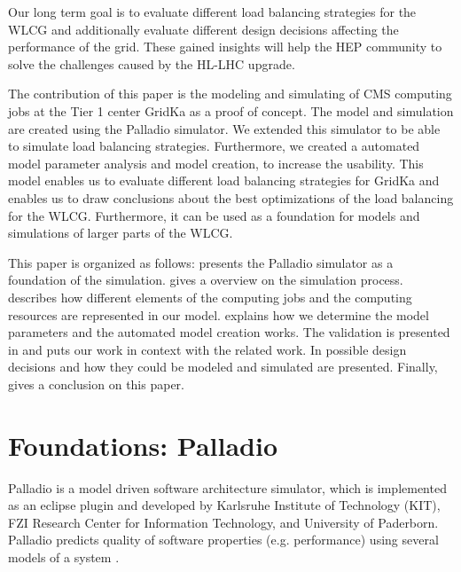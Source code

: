 \documentclass[a4paper]{jpconf}
\begin{document}
Our long term goal is to evaluate different load balancing strategies for the WLCG and additionally evaluate different design decisions affecting the performance of the grid. These gained insights will help the HEP community to solve the challenges caused by the HL-LHC upgrade.

The contribution of this paper is the modeling and simulating of CMS computing jobs at the Tier 1 center GridKa as a proof of concept.
The model and simulation are created using the Palladio simulator. We extended this simulator to be able to simulate load balancing strategies. Furthermore, we created a automated model parameter analysis and model creation, to increase the usability.
This model enables us to evaluate different load balancing strategies for GridKa and enables us to draw conclusions about the best optimizations of the load balancing for the WLCG. Furthermore, it can be used as a foundation for models and simulations of larger parts of the WLCG.


This paper is organized as follows:  presents the Palladio simulator as a foundation of the simulation.  gives a overview on the simulation process.  describes how different elements of the computing jobs and the computing resources are represented in our model.  explains how we determine the model parameters and the automated model creation works. The validation is presented in  and  puts our work in context with the related work. In  possible design decisions and how they could be modeled and simulated are presented. Finally,  gives a conclusion on this paper.


\section{Foundations: Palladio}
\label{sec:palladio}
Palladio is a model driven software architecture simulator, which is implemented as an eclipse plugin and developed by Karlsruhe Institute of Technology (KIT), FZI Research Center for Information Technology, and University of Paderborn. Palladio predicts quality of software properties (e.g. performance) using several models of a system \cite{BECKER20093}.
\end{document}
